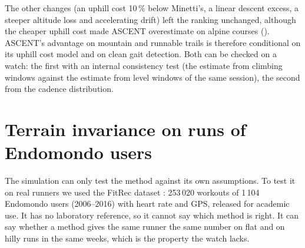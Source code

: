 \documentclass[11pt,a4paper]{article}
\newcommand{\unit}{ml\,kg$^{-1}$\,min$^{-1}$}
\newcommand{\ascent}{ASCENT}
\begin{document}
The other changes (an uphill cost 10\,\% below Minetti's, a linear descent excess, a steeper altitude loss and accelerating drift) left the ranking unchanged, although the cheaper uphill cost made \ascent{} overestimate on alpine courses (\nmmTiltDownskyrunASCENT). \ascent's advantage on mountain and runnable trails is therefore conditional on its uphill cost model and on clean gait detection. Both can be checked on a watch: the first with an internal consistency test (the estimate from climbing windows against the estimate from level windows of the same session), the second from the cadence distribution.

\begin{table}[!htbp]\centering\scriptsize
\caption{Structural mismatch: mean error [RMSE] (\unit) in worlds whose functional forms differ from \ascent's, \nnMismatch{} runners, training and races pooled. Each method is scored on the sessions where it produced an estimate. Valid: percentage of sessions with an estimate for the classic, trail and HR-GAP variants (one shared window selection) / for the no-descent variant; \ascent{} produced an estimate in every session. n/a: fewer than 10 estimates. The \ascent{} values quoted in the text for the overlapping-cadence and combined worlds are on the sessions where the HR-GAP variant also produced an estimate, and differ slightly from this table.}\label{tab:mismatch}

\end{table}

\section{Terrain invariance on \nnFitrecRuns{} runs of \nnFitrecRunners{} Endomondo users}\label{sec:fitrec}

The simulation can only test the method against its own assumptions. To test it on real runners we used the FitRec dataset \citep{ni2019}: 253\,020 workouts of 1\,104 Endomondo users (2006--2016) with heart rate and GPS, released for academic use. It has no laboratory reference, so it cannot say which method is right. It can say whether a method gives the same runner the same number on flat and on hilly runs in the same weeks, which is the property the watch lacks.
\end{document}
